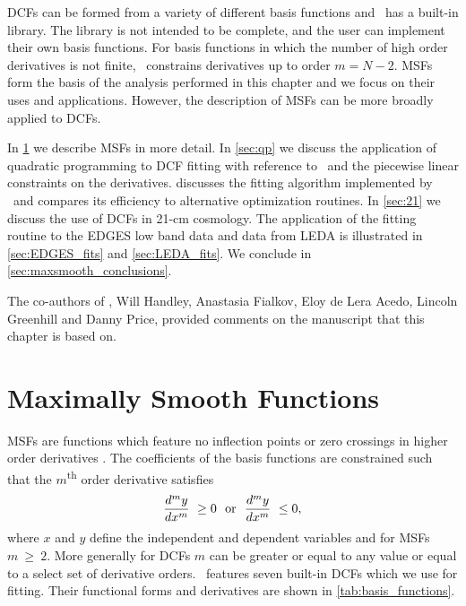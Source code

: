 DCFs can be formed from a variety of different basis functions and \maxsmooth~has a built-in library. The library is not intended to be complete, and the user can implement their own basis functions. For basis functions in which the number of high order derivatives is not finite, \maxsmooth~constrains derivatives up to order $m = N - 2$. MSFs form the basis of the analysis performed in this chapter and we focus on their uses and applications. However, the description of MSFs can be more broadly applied to DCFs.

In \cref{sec:MSFs} we describe MSFs in more detail. In \cref{sec:qp} we discuss the application of quadratic programming to DCF fitting with reference to \cvxopt~and the piecewise linear constraints on the derivatives.  discusses the fitting algorithm implemented by \maxsmooth~and compares its efficiency to alternative optimization routines. In \cref{sec:21} we discuss the use of DCFs in 21-cm cosmology. The application of the fitting routine to the EDGES low band data \citep{Bowman_edges_2018} and data from LEDA \citep{Price_LEDA_2018} is illustrated in \cref{sec:EDGES_fits} and \cref{sec:LEDA_fits}. We conclude in \cref{sec:maxsmooth_conclusions}.

The co-authors of \cite{Bevins_maxsmooth_2021}, Will Handley, Anastasia Fialkov, Eloy de Lera Acedo, Lincoln Greenhill and Danny Price, provided comments on the manuscript that this chapter is based on.

\section{Maximally Smooth Functions}
\label{sec:MSFs}

MSFs are functions which feature no inflection points or zero crossings in higher order derivatives \citep[see][]{Sathyanarayana2015, Sathyanarayana_msf_2017}. The coefficients of the basis functions are constrained such that the $m$\textsuperscript{th} order derivative satisfies
\begin{equation}
    \frac{d^my}{dx^m}~\geq0~~\textnormal{or}~~  \frac{d^my}{dx^m}~\leq0,
    \label{eq:gen_cond}
\end{equation}
where $x$ and $y$ define the independent and dependent variables and for MSFs $m~\ge~2$. More generally for DCFs $m$ can be greater or equal to any value or equal to a select set of derivative orders. \maxsmooth~features seven built-in DCFs which we use for fitting. Their functional forms and derivatives are shown in \cref{tab:basis_functions}.

